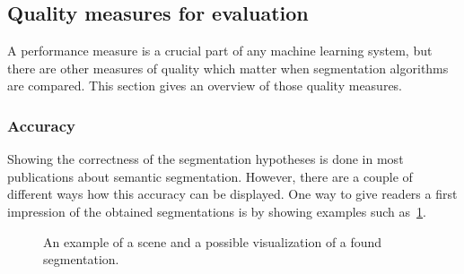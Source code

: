 
\subsection{Quality measures for evaluation}%
\label{subsec:quality-measures}%
A performance measure is a crucial part of any machine learning system, but
there are other measures of quality which matter when segmentation algorithms
are compared. This section gives an overview of those quality measures.


\subsubsection{Accuracy}
Showing the correctness of the segmentation hypotheses is done in most
publications about semantic segmentation. However, there are a couple of
different ways how this accuracy can be displayed. One way to give readers a
first impression of the obtained segmentations is by showing examples such
as~\cref{fig:segmentation-example}.

\begin{figure}
\centering
{}%
\caption{An example of a scene and a possible visualization of a found segmentation.}
\label{fig:segmentation-example}
\end{figure}

